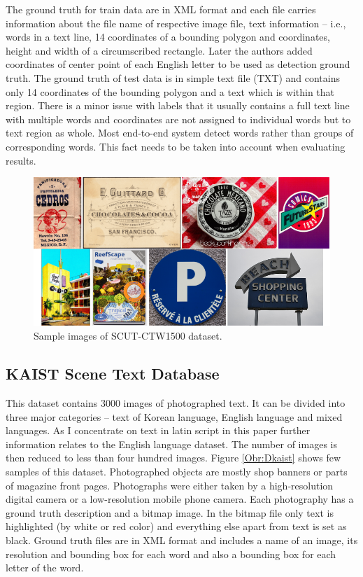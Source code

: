 The ground truth for train data are in XML format and each file carries information about the file name of respective image file, text information -- i.e., words in a text line, 14 coordinates of a bounding polygon and coordinates, height and width of a circumscribed rectangle. Later the authors added coordinates of center point of each English letter to be used as detection ground truth. The ground truth of test data is in simple text file (TXT) and contains only 14 coordinates of the bounding polygon and a text which is within that region. There is a minor issue with labels that it usually contains a full text line with multiple words and coordinates are not assigned to individual words but to text region as whole. Most end-to-end system detect words rather than groups of corresponding words. This fact needs to be taken into account when evaluating results.

\begin{figure}[hbtp]
    \centering
    \includegraphics[scale=0.4]{obrazky/Dataset_ctw.png}
    \caption{Sample images of SCUT-CTW1500 dataset.}
    \label{Obr:Dctw}
\end{figure}

\subsection{KAIST Scene Text Database}

This dataset contains 3000 images of photographed text. It can be divided into three major categories -- text of Korean language, English language and mixed languages. As I concentrate on text in latin script in this paper further information relates to the English language dataset. The number of images is then reduced to less than four hundred images. Figure \ref*{Obr:Dkaist} shows few samples of this dataset. Photographed objects are mostly shop banners or parts of magazine front pages. Photographs were either taken by a high-resolution digital camera or a low-resolution mobile phone camera.\cite{kaist} Each photography has a ground truth description and a bitmap image. In the bitmap file only text is highlighted (by white or red color) and everything else apart from text is set as black. Ground truth files are in XML format and includes a name of an image, its resolution and bounding box for each word and also a bounding box for each letter of the word.

